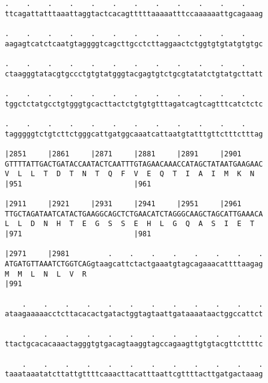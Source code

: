 \documentclass{article}
\begin{document}
\begin{Verbatim}
.    .    .    .    .    .    .    .    .    .    .    .    
ttcagattatttaaattaggtactcacagtttttaaaaatttccaaaaaattgcagaaag
                                                            
.    .    .    .    .    .    .    .    .    .    .    .    
aagagtcatctcaatgtaggggtcagcttgcctcttaggaactctggtgtgtatgtgtgc
                                                            
.    .    .    .    .    .    .    .    .    .    .    .    
ctaagggtatacgtgccctgtgtatgggtacgagtgtctgcgtatatctgtatgcttatt
                                                            
.    .    .    .    .    .    .    .    .    .    .    .    
tggctctatgcctgtgggtgcacttactctgtgtgtttagatcagtcagtttcatctctc
                                                            
.    .    .    .    .    .    .    .    .    .    .    .    
tagggggtctgtcttctgggcattgatggcaaatcattaatgtatttgttctttctttag
                                                            
|2851     |2861     |2871     |2881     |2891     |2901     
GTTTTATTGACTGATACCAATACTCAATTTGTAGAACAAACCATAGCTATAATGAAGAAC
V  L  L  T  D  T  N  T  Q  F  V  E  Q  T  I  A  I  M  K  N  
|951                          |961                          
  
|2911     |2921     |2931     |2941     |2951     |2961     
TTGCTAGATAATCATACTGAAGGCAGCTCTGAACATCTAGGGCAAGCTAGCATTGAAACA
L  L  D  N  H  T  E  G  S  S  E  H  L  G  Q  A  S  I  E  T  
|971                          |981                          
  
|2971     |2981         .    .    .    .    .    .    .    .
ATGATGTTAAATCTGGTCAGgtaagcattctactgaaatgtagcagaaacattttaagag
M  M  L  N  L  V  R                                         
|991                                                        
  
    .    .    .    .    .    .    .    .    .    .    .    .
ataagaaaaacctcttacacactgatactggtagtaattgataaaataactggccattct
                                                            
    .    .    .    .    .    .    .    .    .    .    .    .
ttactgcacacaaactagggtgtgacagtaaggtagccagaagttgtgtacgttcttttc
                                                            
    .    .    .    .    .    .    .    .    .    .    .    .
taaataaatatcttattgttttcaaacttacatttaattcgttttacttgatgactaaag
                                                            

\end{Verbatim}
\end{document}

